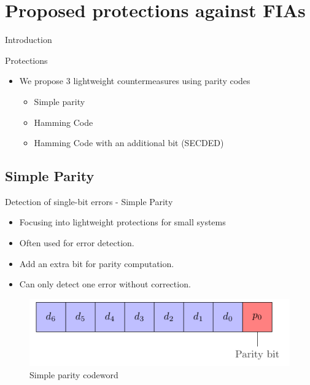 \section{Proposed protections against FIAs}


\begin{frame}{Introduction}
    \begin{block}{Protections}
        \begin{itemize}
            \item We propose 3 lightweight countermeasures using parity codes
            \begin{itemize}
                \item Simple parity
                \item Hamming Code
                \item Hamming Code with an additional bit (SECDED)
            \end{itemize}
        \end{itemize}
    \end{block}
\end{frame}
\subsection{Simple Parity}
    \begin{frame}{Detection of single-bit errors - Simple Parity}
        \begin{block}{}
            \begin{itemize}
                \justifying
                \item Focusing into lightweight protections for small systems
                \item Often used for error detection.
                \item Add an extra bit for parity computation.
                \item Can only detect one error without correction.
            \end{itemize}
        \end{block}

        \vfill
        
        \begin{figure}
            \centering
            \includegraphics[width=.5\textwidth, page=1]{src/4_strategies/img/simple_parity.pdf}
            \caption{Simple parity codeword}
            \label{fig:simple_parity_codeword}
        \end{figure}
    \end{frame}

